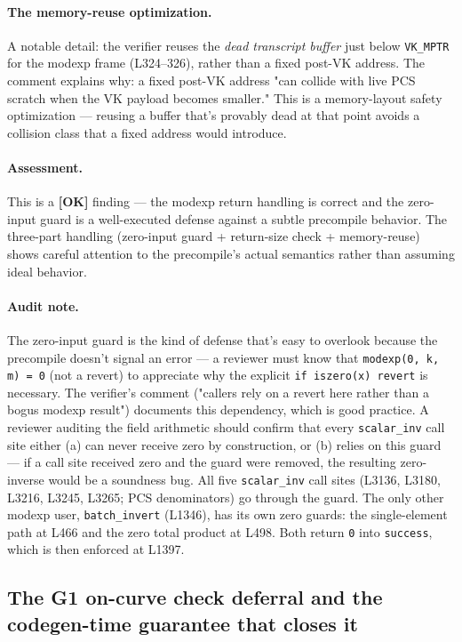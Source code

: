 \paragraph{The memory-reuse optimization.} A notable detail: the
verifier reuses the \emph{dead transcript buffer} just below
\texttt{VK\_MPTR} for the modexp frame (L324--326), rather than a
fixed post-VK address. The comment explains why: a fixed post-VK
address "can collide with live PCS scratch when the VK payload
becomes smaller." This is a memory-layout safety optimization ---
reusing a buffer that's provably dead at that point avoids a
collision class that a fixed address would introduce.

\paragraph{Assessment.} This is a
\textcolor{tracegreen}{\textbf{[OK]}} finding --- the modexp
return handling is correct and the zero-input guard is a
well-executed defense against a subtle precompile behavior. The
three-part handling (zero-input guard + return-size check +
memory-reuse) shows careful attention to the precompile's actual
semantics rather than assuming ideal behavior.

\paragraph{Audit note.} The zero-input guard is the kind of defense
that's easy to overlook because the precompile doesn't signal an
error --- a reviewer must know that \texttt{modexp(0, k, m) = 0}
(not a revert) to appreciate why the explicit
\texttt{if iszero(x) revert} is necessary. The verifier's comment
("callers rely on a revert here rather than a bogus modexp result")
documents this dependency, which is good practice. A reviewer
auditing the field arithmetic should confirm that every
\texttt{scalar\_inv} call site either (a) can never receive zero
by construction, or (b) relies on this guard --- if a call site
received zero and the guard were removed, the resulting zero-inverse
would be a soundness bug.  All five
\texttt{scalar\_inv} call sites (L3136, L3180, L3216, L3245, L3265;
PCS denominators) go through the guard. The only other modexp user,
\texttt{batch\_invert} (L1346), has its own zero guards: the
single-element path at L466 and the zero total product at L498.
Both return \texttt{0} into \texttt{success}, which is then
enforced at L1397.

\subsection{The G1 on-curve check deferral and the codegen-time guarantee that closes it}
\label{sec:pr-oncurve}

